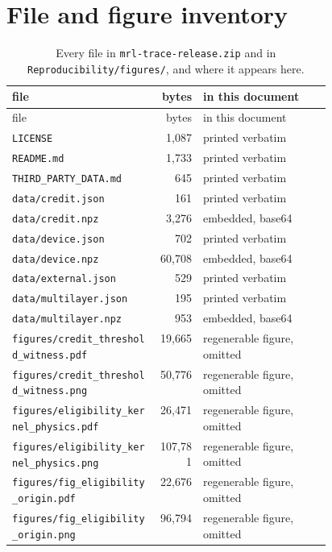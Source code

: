 \documentclass[a4paper,10pt]{article}
\begin{document}
\section{File and figure inventory}
\begin{longtable}{@{}p{0.46\linewidth} r l@{}}
\caption{Every file in \texttt{mrl-trace-release.zip} and in \texttt{Reproducibility/figures/}, and where it appears here.}\\
\toprule file & bytes & in this document \\ \midrule
\endfirsthead
\toprule file & bytes & in this document \\ \midrule
\endhead
\bottomrule
\endlastfoot
\texttt{\scriptsize LICENSE} & 1,087 & printed verbatim \\
\texttt{\scriptsize README.md} & 1,733 & printed verbatim \\
\texttt{\scriptsize THIRD\_PARTY\_DATA.md} & 645 & printed verbatim \\
\texttt{\scriptsize data/credit.json} & 161 & printed verbatim \\
\texttt{\scriptsize data/credit.npz} & 3,276 & embedded, base64 \\
\texttt{\scriptsize data/device.json} & 702 & printed verbatim \\
\texttt{\scriptsize data/device.npz} & 60,708 & embedded, base64 \\
\texttt{\scriptsize data/external.json} & 529 & printed verbatim \\
\texttt{\scriptsize data/multilayer.json} & 195 & printed verbatim \\
\texttt{\scriptsize data/multilayer.npz} & 953 & embedded, base64 \\
\texttt{\scriptsize figures/credit\_threshold\_witness.pdf} & 19,665 & regenerable figure, omitted \\
\texttt{\scriptsize figures/credit\_threshold\_witness.png} & 50,776 & regenerable figure, omitted \\
\texttt{\scriptsize figures/eligibility\_kernel\_physics.pdf} & 26,471 & regenerable figure, omitted \\
\texttt{\scriptsize figures/eligibility\_kernel\_physics.png} & 107,781 & regenerable figure, omitted \\
\texttt{\scriptsize figures/fig\_eligibility\_origin.pdf} & 22,676 & regenerable figure, omitted \\
\texttt{\scriptsize figures/fig\_eligibility\_origin.png} & 96,794 & regenerable figure, omitted \\

\end{longtable}
\end{document}

